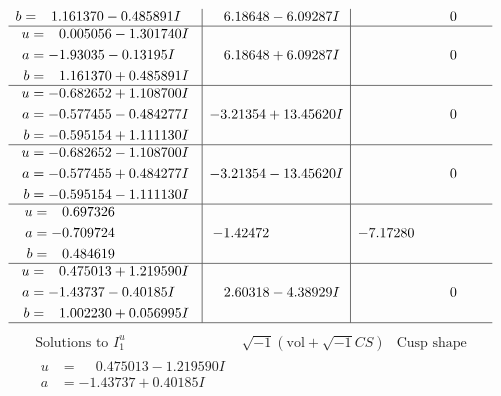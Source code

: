 \documentclass[1p]{elsarticle_modified}
\theoremstyle{definition}
\newcommand{\I}{\sqrt{-1}}
\begin{document}
$$\begin{array}{c|c|c}
\begin{aligned}
b &= \phantom{-}1.161370 - 0.485891 I\end{aligned}
 & \phantom{-}6.18648 - 6.09287 I & \phantom{-0.000000 } 0 \\ \hline\begin{aligned}
u &= \phantom{-}0.005056 - 1.301740 I \\
a &= -1.93035 - 0.13195 I \\
b &= \phantom{-}1.161370 + 0.485891 I\end{aligned}
 & \phantom{-}6.18648 + 6.09287 I & \phantom{-0.000000 } 0 \\ \hline\begin{aligned}
u &= -0.682652 + 1.108700 I \\
a &= -0.577455 - 0.484277 I \\
b &= -0.595154 + 1.111130 I\end{aligned}
 & -3.21354 + 13.45620 I & \phantom{-0.000000 } 0 \\ \hline\begin{aligned}
u &= -0.682652 - 1.108700 I \\
a &= -0.577455 + 0.484277 I \\
b &= -0.595154 - 1.111130 I\end{aligned}
 & -3.21354 - 13.45620 I & \phantom{-0.000000 } 0 \\ \hline\begin{aligned}
u &= \phantom{-}0.697326\phantom{ +0.000000I} \\
a &= -0.709724\phantom{ +0.000000I} \\
b &= \phantom{-}0.484619\phantom{ +0.000000I}\end{aligned}
 & -1.42472\phantom{ +0.000000I} & -7.17280\phantom{ +0.000000I} \\ \hline\begin{aligned}
u &= \phantom{-}0.475013 + 1.219590 I \\
a &= -1.43737 - 0.40185 I \\
b &= \phantom{-}1.002230 + 0.056995 I\end{aligned}
 & \phantom{-}2.60318 - 4.38929 I & \phantom{-0.000000 } 0\\
 \hline 
 \end{array}$$\newpage$$\begin{array}{c|c|c}  
\text{Solutions to }I^u_{1}& \I (\text{vol} + \sqrt{-1}CS) & \text{Cusp shape}\\
 \hline 
\begin{aligned}
u &= \phantom{-}0.475013 - 1.219590 I \\
a &= -1.43737 + 0.40185 I \\

\end{aligned}
\end{array}$$
\end{document}
